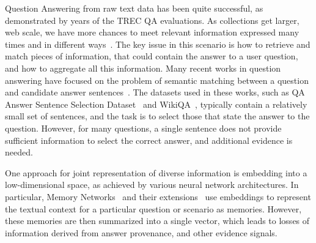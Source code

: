 Question Answering from raw text data has been quite successful, as demonstrated by years of the TREC QA evaluations.
As collections get larger, \eg web scale, we have more chances to meet relevant information expressed many times and in different ways~\cite{clarke2001exploiting}.
The key issue in this scenario is how to retrieve and match pieces of information, that could contain the answer to a user question, and how to aggregate all this information.
Many recent works in question answering have focused on the problem of semantic matching between a question and candidate answer sentences~\cite{he2016pairwise,rao2016noise,yang2016anmm}.
The datasets used in these works, such as QA Answer Sentence Selection Dataset~\cite{wang2007jeopardy} and WikiQA~\cite{yang2015wikiqa}, typically contain a relatively small set of sentences, and the task is to select those that state the answer to the question.
However, for many questions, a single sentence does not provide sufficient information to select the correct answer, and additional evidence is needed.



One approach for joint representation of diverse information is embedding into a low-dimensional space, \ie as achieved by various neural network architectures.
In particular, Memory Networks~\cite{sukhbaatar2015end} and their extensions~\cite{miller2016key} use embeddings to represent the textual context for a particular question or scenario as memories.
However, these memories are then summarized into a single vector, which leads to losses of information derived from answer provenance, and other evidence signals.

